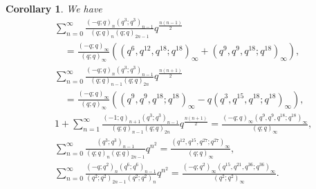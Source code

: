 \documentclass[reqno,12pt]{amsart}
\newtheorem{corollary}[theorem]{Corollary}
\theoremstyle{remark}
\numberwithin{equation}{section}
\begin{document}
\begin{corollary}
We have
\begin{align}
&\sum_{n=0}^{\infty}\frac{\left(-q;q\right)_n\left(q^3;q^3\right)_{n-1}
}
{\left(q;q\right)_{n}\left(q;q\right)_{2n-1}}q^{\frac{n(n-1)}{2}}\nonumber\\
&\quad=\frac{\left(-q;q\right)_{\infty}}{\left(q;q\right)_{\infty}}
\left(
\left(q^{6},q^{12},q^{18};q^{18}\right)_{\infty}+
\left(q^{9},q^{9},q^{18};q^{18}\right)_{\infty}\right)
,\tag{S.73}\label{S.73}\\
&\sum_{n=0}^{\infty}\frac{\left(-q;q\right)_n\left(q^3;q^3\right)_{n-1}
}
{\left(q;q\right)_{n-1}\left(q;q\right)_{2n}}q^{\frac{n(n+1)}{2}}\nonumber\\
&\quad=\frac{\left(-q;q\right)_{\infty}}{\left(q;q\right)_{\infty}}
\left(
\left(q^{9},q^{9},q^{18};q^{18}\right)_{\infty}-q
\left(q^{3},q^{15},q^{18};q^{18}\right)_{\infty}\right)
,\tag{S.75}\label{S.75}\\
&1+\sum_{n=1}^{\infty}\frac{\left(-1;q\right)_{n+1}\left(q^3;q^3\right)_{n-1}
}
{\left(q;q\right)_{n-1}\left(q;q\right)_{2n}}q^{\frac{n(n+1)}{2}}
=\frac{\left(-q;q\right)_{\infty}\left(q^{9},q^{9},q^{18};q^{18}\right)_{\infty}}{\left(q;q\right)_{\infty}}
,\tag{S.78}\label{S.78}\\
&\sum_{n=0}^{\infty}\frac{\left(q^3;q^3\right)_{n-1}}
{\left(q;q\right)_n\left(q;q\right)_{2n-1}}q^{n^2}
=\frac{\left(q^{12},q^{15},q^{27};q^{27}\right)_{\infty}}{\left(q;q\right)_{\infty}}
,\tag{S.93}\label{S.93}\\
&\sum_{n=0}^{\infty}\frac{\left(-q;q^2\right)_{n}
\left(q^6;q^6\right)_{n-1}}
{\left(q^2;q^2\right)_{2n-1}\left(q^2;q^2\right)_n}q^{n^2}
=\frac{\left(-q;q^2\right)_{\infty}\left(q^{15},q^{21},q^{36};q^{36}\right)_{\infty}}
{\left(q^2;q^2\right)_{\infty}}.\tag{S.114} \label{S.114}
\end{align}
\end{corollary}
\end{document}
